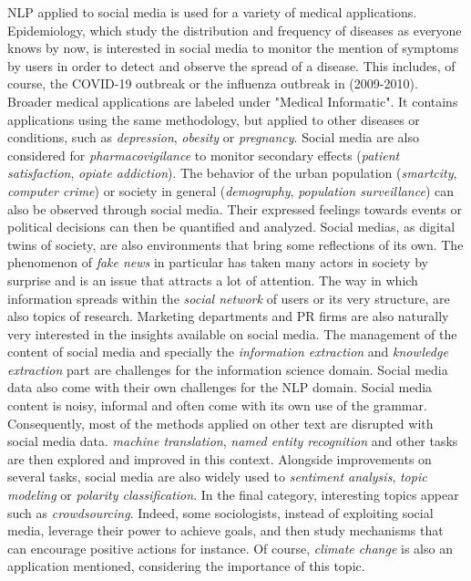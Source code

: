 NLP applied to social media is used for a variety of medical applications.
Epidemiology, which study the distribution and frequency of diseases as everyone knows by now,
is interested in social media to monitor the mention of symptoms by users in order to detect and observe the spread of a disease.
This includes, of course, the COVID-19 outbreak or the influenza outbreak in (2009-2010).
Broader medical applications are labeled under "Medical Informatic".
It contains applications using the same methodology, but applied to other diseases or conditions, such as \emph{depression}, \emph{obesity} or \emph{pregnancy}.
Social media are also considered for \emph{pharmacovigilance} to monitor secondary effects (\emph{patient satisfaction}, \emph{opiate addiction}).
The behavior of the urban population (\emph{smartcity}, \emph{computer crime}) or society in general (\emph{demography}, \emph{population surveillance}) can also be observed through social media.
Their expressed feelings towards events or political decisions can then be quantified and analyzed.
Social medias, as digital twins of society, are also environments that bring some reflections of its own.
The phenomenon of \emph{fake news} in particular has taken many actors in society by surprise and is an issue that attracts a lot of attention.
The way in which information spreads within the \emph{social network} of users or its very structure, are also topics of research.
Marketing departments and PR firms are also naturally very interested in the insights available on social media.
The management of the content of social media and specially the \emph{information extraction} and \emph{knowledge extraction} part
are challenges for the information science domain.
Social media data also come with their own challenges for the NLP domain.
Social media content is noisy, informal and often come with its own use of the grammar.
Consequently, most of the methods applied on other text are disrupted with social media data.
\emph{machine translation}, \emph{named entity recognition} and other tasks are then explored and improved in this context.
Alongside improvements on several tasks, social media are also widely used to \emph{sentiment analysis}, \emph{topic modeling} or \emph{polarity classification}.
In the final category, interesting topics appear such as \emph{crowdsourcing}.
Indeed, some sociologists, instead of exploiting social media, leverage their power to achieve goals, and then study mechanisms that can encourage positive actions for instance.
Of course, \emph{climate change} is also an application mentioned, considering the importance of this topic.

